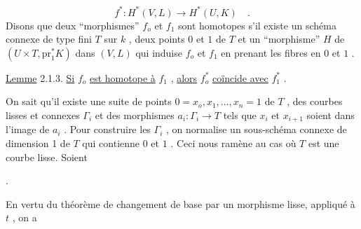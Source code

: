 \begin{equation*}
f^* : H^*(V,L) \longrightarrow H^*(U,K) \quad .
\end{equation*}
Disons que deux ``morphismes'' $f_o$ et $f_1$ sont homotopes s'il existe un schéma connexe de type fini $T$ sur $k$ , deux points $0$ et $1$ de $T$ et un ``morphisme'' $H$ de $(U \times T , \mathrm{pr}_1^* K)$ dans $(V,L)$ qui induise $f_o$ et $f_1$ en prenant les fibres en $0$ et $1$ .

\underline{Lemme} 2.1.3. \underline{Si} $f_o$ \underline{est homotope à} $f_1$ , \underline{alors} $f_o^*$ \underline{coïncide avec} $f_1^*$ .

On sait qu'il existe une suite de points $0 = x_o,x_1,\ldots,x_n = 1$ de $T$ , des courbes lisses et connexes $\Gamma_i$ et des morphismes $a_i : \Gamma_i \to T$ tels que $x_i$ et $x_{i+1}$ soient dans l'image de $a_i$ . Pour construire les $\Gamma_i$ , on normalise un sous-schéma connexe de dimension 1 de $T$ qui contienne $0$ et $1$ . Ceci nous ramène au cas où $T$ est une courbe lisse. Soient

\begin{center}
\quad .
\end{center}
En vertu du théorème de changement de base par un morphisme lisse, appliqué à $t$ , on a

